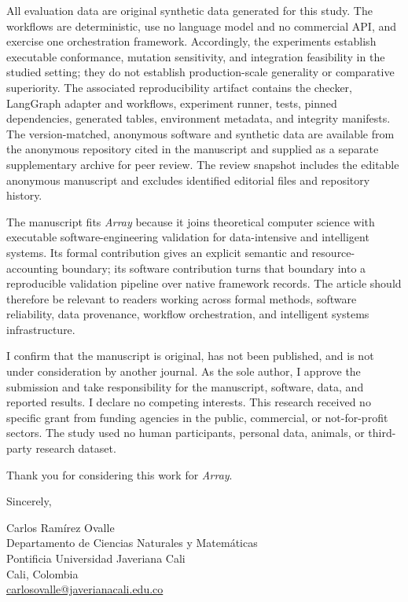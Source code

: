 \documentclass[11pt]{article}
\begin{document}
All evaluation data are original synthetic data generated for this study. The
workflows are deterministic, use no language model and no commercial API, and
exercise one orchestration framework. Accordingly, the experiments establish
executable conformance, mutation sensitivity, and integration feasibility in
the studied setting; they do not establish production-scale generality or
comparative superiority. The associated reproducibility artifact contains the
checker, LangGraph adapter and workflows, experiment runner, tests, pinned
dependencies, generated tables, environment metadata, and integrity manifests.
The version-matched, anonymous software and synthetic data are available from
the anonymous repository cited in the manuscript and supplied as a separate
supplementary archive for peer review. The review
snapshot includes the editable anonymous manuscript and excludes identified
editorial files and repository history.

The manuscript fits \emph{Array} because it joins theoretical computer science
with executable software-engineering validation for data-intensive and
intelligent systems. Its formal contribution gives an explicit semantic and
resource-accounting boundary; its software contribution turns that boundary
into a reproducible validation pipeline over native framework records. The
article should therefore be relevant to readers working across formal methods,
software reliability, data provenance, workflow orchestration, and intelligent
systems infrastructure.

I confirm that the manuscript is original, has not been published, and is not
under consideration by another journal. As the sole author, I approve the
submission and take responsibility for the manuscript, software, data, and
reported results. I declare no competing interests. This research received no
specific grant from funding agencies in the public, commercial, or not-for-profit
sectors. The study used no human participants, personal data, animals, or
third-party research dataset.

Thank you for considering this work for \emph{Array}.

Sincerely,

\vspace{2mm}
Carlos Ram\'irez Ovalle\\
Departamento de Ciencias Naturales y Matem\'aticas\\
Pontificia Universidad Javeriana Cali\\
Cali, Colombia\\
\href{mailto:carlosovalle@javerianacali.edu.co}{carlosovalle@javerianacali.edu.co}
\end{document}
